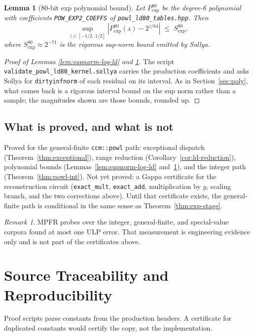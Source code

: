 \documentclass[11pt]{article}
\theoremstyle{plain}
\newtheorem{lemma}{Lemma}
\theoremstyle{remark}
\newtheorem{remark}{Remark}
\newcommand{\Powl}{\texttt{ccm::powl}}
\begin{document}
\begin{lemma}[80-bit exp polynomial bound]
\label{lem:supnorm-exp-ld}
Let $P_{\!\exp}^{80}$ be the degree-6 polynomial with coefficients
\texttt{POW\_EXP2\_COEFFS} of \texttt{powl\_ld80\_tables.hpp}.  Then
\[
  \sup_{z \in [-1/2,\,1/2]}
  \left| P_{\!\exp}^{80}(z) - 2^{z/64} \right|
  \;\le\; S_{\exp}^{80},
\]
where $S_{\exp}^{80} \approx 2^{-71}$ is the rigorous sup-norm bound emitted by
Sollya.
\end{lemma}

\begin{proof}[Proof of Lemmas \ref{lem:supnorm-log-ld} and \ref{lem:supnorm-exp-ld}]
The script \texttt{validate\_powl\_ld80\_kernel.sollya} carries the production
coefficients and asks Sollya for \texttt{dirtyinfnorm} of each residual on its
interval.  As in Section~\ref{sec:poly}, what comes back is a rigorous interval
bound on the sup norm rather than a sample; the magnitudes shown are those
bounds, rounded up.
\end{proof}

\subsection{What is proved, and what is not}

Proved for the general-finite \Powl{} path: exceptional dispatch
(Theorem~\ref{thm:exceptional}), range reduction (Corollary~\ref{cor:ld-reduction}),
polynomial bounds (Lemmas~\ref{lem:supnorm-log-ld} and~\ref{lem:supnorm-exp-ld}),
and the integer path (Theorem~\ref{thm:powl-int}).  Not yet proved: a Gappa
certificate for the reconstruction circuit (\texttt{exact\_mult},
\texttt{exact\_add}, multiplication by $y$, scaling branch, and the two
corrections above).  Until that certificate exists, the general-finite path is
conditional in the same sense as Theorem~\ref{thm:exp-stage}.

\begin{remark}
MPFR probes over the integer, general-finite, and special-value corpora found at
most one ULP error.  That measurement is engineering evidence only and is not
part of the certificates above.
\end{remark}

\section{Source Traceability and Reproducibility}
\label{sec:traceability}

Proof scripts parse constants from the production headers.  A certificate for
duplicated constants would certify the copy, not the implementation.
\end{document}
